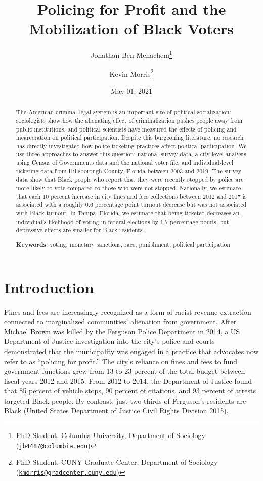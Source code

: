 \documentclass[
  12pt,
]{article}
\title{Policing for Profit and the Mobilization of Black Voters}
\author{Jonathan Ben-Menachem\footnote{PhD Student, Columbia University, Department of Sociology (\href{mailto:jb4487@columbia.edu}{\nolinkurl{jb4487@columbia.edu}})} \and Kevin Morris\footnote{PhD Student, CUNY Graduate Center, Department of Sociology (\href{mailto:kmorris@gradcenter.cuny.edu}{\nolinkurl{kmorris@gradcenter.cuny.edu}})}}
\date{May 01, 2021}
\begin{document}
\maketitle
\begin{abstract}
The American criminal legal system is an important site of political socialization: sociologists show how the alienating effect of criminalization pushes people away from public institutions, and political scientists have measured the effects of policing and incarceration on political participation. Despite this burgeoning literature, no research has directly investigated how police ticketing practices affect political participation. We use three approaches to answer this question: national survey data, a city-level analysis using Census of Governments data and the national voter file, and individual-level ticketing data from Hillsborough County, Florida between 2003 and 2019. The survey data show that Black people who report that they were recently stopped by police are more likely to vote compared to those who were not stopped. Nationally, we estimate that each 10 percent increase in city fines and fees collections between 2012 and 2017 is associated with a roughly 0.6 percentage point turnout decrease but was not associated with Black turnout. In Tampa, Florida, we estimate that being ticketed decreases an individual's likelihood of voting in federal elections by 1.7 percentage points, but depressive effects are smaller for Black residents.

\hfill\break

\textbf{Keywords}: voting, monetary sanctions, race, punishment, political participation
\end{abstract}

\pagebreak

\doublespacing

\hypertarget{introduction}{%
\section*{Introduction}\label{introduction}}

Fines and fees are increasingly recognized as a form of racist revenue extraction connected to marginalized communities' alienation from government. After Michael Brown was killed by the Ferguson Police Department in 2014, a US Department of Justice investigation into the city's police and courts demonstrated that the municipality was engaged in a practice that advocates now refer to as ``policing for profit.'' The city's reliance on fines and fees to fund government functions grew from 13 to 23 percent of the total budget between fiscal years 2012 and 2015. From 2012 to 2014, the Department of Justice found that 85 percent of vehicle stops, 90 percent of citations, and 93 percent of arrests targeted Black people. By contrast, just two-thirds of Ferguson's residents are Black (\protect\hyperlink{ref-UnitedStatesDepartmentofJusticeCivilRightsDivision2015}{United States Department of Justice Civil Rights Division 2015}).
\end{document}
